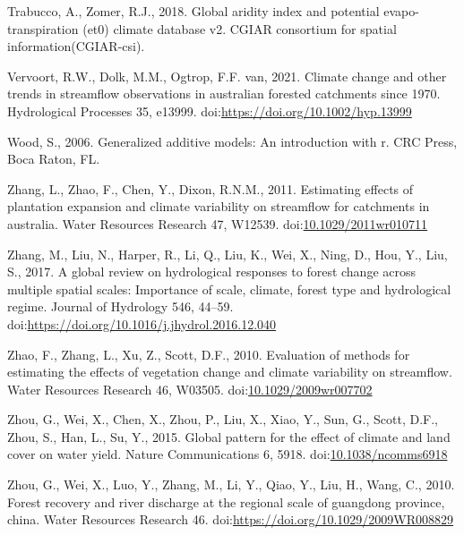 \documentclass[]{elsarticle} %
\begin{document}
\leavevmode\hypertarget{ref-trabucco2018}{}%
Trabucco, A., Zomer, R.J., 2018. Global aridity index and potential evapo-transpiration (et0) climate database v2. CGIAR consortium for spatial information(CGIAR-csi).

\leavevmode\hypertarget{ref-vervoort2021}{}%
Vervoort, R.W., Dolk, M.M., Ogtrop, F.F. van, 2021. Climate change and other trends in streamflow observations in australian forested catchments since 1970. Hydrological Processes 35, e13999. doi:\href{https://doi.org/https://doi.org/10.1002/hyp.13999}{https://doi.org/10.1002/hyp.13999}

\leavevmode\hypertarget{ref-wood2006}{}%
Wood, S., 2006. Generalized additive models: An introduction with r. CRC Press, Boca Raton, FL.

\leavevmode\hypertarget{ref-zhang2011}{}%
Zhang, L., Zhao, F., Chen, Y., Dixon, R.N.M., 2011. Estimating effects of plantation expansion and climate variability on streamflow for catchments in australia. Water Resources Research 47, W12539. doi:\href{https://doi.org/10.1029/2011wr010711}{10.1029/2011wr010711}

\leavevmode\hypertarget{ref-zhang2017}{}%
Zhang, M., Liu, N., Harper, R., Li, Q., Liu, K., Wei, X., Ning, D., Hou, Y., Liu, S., 2017. A global review on hydrological responses to forest change across multiple spatial scales: Importance of scale, climate, forest type and hydrological regime. Journal of Hydrology 546, 44--59. doi:\href{https://doi.org/https://doi.org/10.1016/j.jhydrol.2016.12.040}{https://doi.org/10.1016/j.jhydrol.2016.12.040}

\leavevmode\hypertarget{ref-zhao2010}{}%
Zhao, F., Zhang, L., Xu, Z., Scott, D.F., 2010. Evaluation of methods for estimating the effects of vegetation change and climate variability on streamflow. Water Resources Research 46, W03505. doi:\href{https://doi.org/10.1029/2009wr007702}{10.1029/2009wr007702}

\leavevmode\hypertarget{ref-zhou2015}{}%
Zhou, G., Wei, X., Chen, X., Zhou, P., Liu, X., Xiao, Y., Sun, G., Scott, D.F., Zhou, S., Han, L., Su, Y., 2015. Global pattern for the effect of climate and land cover on water yield. Nature Communications 6, 5918. doi:\href{https://doi.org/10.1038/ncomms6918}{10.1038/ncomms6918}

\leavevmode\hypertarget{ref-zhou2010}{}%
Zhou, G., Wei, X., Luo, Y., Zhang, M., Li, Y., Qiao, Y., Liu, H., Wang, C., 2010. Forest recovery and river discharge at the regional scale of guangdong province, china. Water Resources Research 46. doi:\href{https://doi.org/https://doi.org/10.1029/2009WR008829}{https://doi.org/10.1029/2009WR008829}
\end{document}
